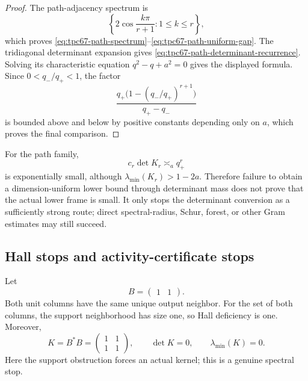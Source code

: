 \begin{proof}
The path-adjacency spectrum is
\[
 \left\{2\cos\frac{k\pi}{r+1}:1\le k\le r\right\},
\]
which proves
\eqref{eq:tpc67-path-spectrum}--\eqref{eq:tpc67-path-uniform-gap}.
The tridiagonal determinant expansion gives
\eqref{eq:tpc67-path-determinant-recurrence}.  Solving its characteristic
equation \(q^2-q+a^2=0\) gives the displayed formula.  Since
\(0<q_-/q_+<1\), the factor
\[
 \frac{q_+\bigl(1-(q_-/q_+)^{r+1}\bigr)}{q_+-q_-}
\]
is bounded above and below by positive constants depending only on
\(a\), which proves the final comparison.
\end{proof}

\begin{remark}
\label{rem:tpc67-determinant-not-spectral-stop}
For the path family,
\[
 c_r\det K_r\asymp_a q_+^r
\]
is exponentially small, although
\(\lambda_{\min}(K_r)>1-2a\).  Therefore failure to obtain a
dimension-uniform lower bound through determinant mass does not prove
that the actual lower frame is small.  It only stops the determinant
conversion as a sufficiently strong route; direct spectral-radius,
Schur, forest, or other Gram estimates may still succeed.
\end{remark}

\subsection{Hall stops and activity-certificate stops}

\begin{example}
\label{ex:tpc67-Hall-deficiency-kernel}
Let
\[
 B=\begin{pmatrix}1&1\end{pmatrix}.
\]
Both unit columns have the same unique output neighbor.  For the set of
both columns, the support neighborhood has size one, so Hall deficiency
is one.  Moreover,
\[
 K=B^*B=
 \begin{pmatrix}1&1\\1&1\end{pmatrix},
 \qquad
 \det K=0,
 \qquad
 \lambda_{\min}(K)=0.
\]
Here the support obstruction forces an actual kernel; this is a genuine
spectral stop.
\end{example}


